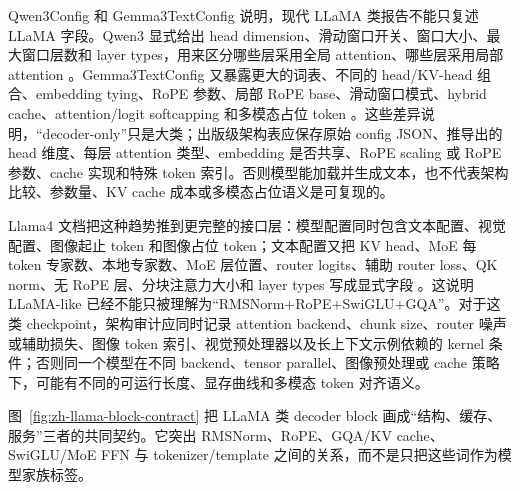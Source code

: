 \documentclass[UTF8,zihao=-4,openany]{ctexbook}
\begin{document}
Qwen3Config 和 Gemma3TextConfig 说明，现代 LLaMA 类报告不能只复述 LLaMA 字段。Qwen3 显式给出 head dimension、滑动窗口开关、窗口大小、最大窗口层数和 layer types，用来区分哪些层采用全局 attention、哪些层采用局部 attention \cite{huggingface2026transformersqwen3}。Gemma3TextConfig 又暴露更大的词表、不同的 head/KV-head 组合、embedding tying、RoPE 参数、局部 RoPE base、滑动窗口模式、hybrid cache、attention/logit softcapping 和多模态占位 token \cite{huggingface2026transformersgemma3}。这些差异说明，“decoder-only”只是大类；出版级架构表应保存原始 config JSON、推导出的 head 维度、每层 attention 类型、embedding 是否共享、RoPE scaling 或 RoPE 参数、cache 实现和特殊 token 索引。否则模型能加载并生成文本，也不代表架构比较、参数量、KV cache 成本或多模态占位语义是可复现的。

Llama4 文档把这种趋势推到更完整的接口层：模型配置同时包含文本配置、视觉配置、图像起止 token 和图像占位 token；文本配置又把 KV head、MoE 每 token 专家数、本地专家数、MoE 层位置、router logits、辅助 router loss、QK norm、无 RoPE 层、分块注意力大小和 layer types 写成显式字段 \cite{huggingface2026transformersllama4}。这说明 LLaMA-like 已经不能只被理解为“RMSNorm+RoPE+SwiGLU+GQA”。对于这类 checkpoint，架构审计应同时记录 attention backend、chunk size、router 噪声或辅助损失、图像 token 索引、视觉预处理器以及长上下文示例依赖的 kernel 条件；否则同一个模型在不同 backend、tensor parallel、图像预处理或 cache 策略下，可能有不同的可运行长度、显存曲线和多模态 token 对齐语义。

图~\ref{fig:zh-llama-block-contract} 把 LLaMA 类 decoder block 画成“结构、缓存、服务”三者的共同契约。它突出 RMSNorm、RoPE、GQA/KV cache、SwiGLU/MoE FFN 与 tokenizer/template 之间的关系，而不是只把这些词作为模型家族标签。
\end{document}
